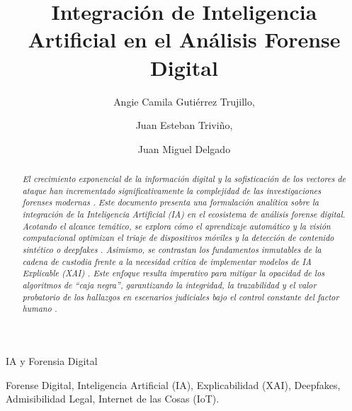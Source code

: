 \documentclass[journal]{IEEEtran}
\begin{document}
\title{Integración de Inteligencia Artificial en el Análisis Forense Digital}

\author{Angie Camila Gutiérrez Trujillo, %
\and Juan Esteban Triviño,  %
\and Juan Miguel Delgado %
}

%
{IA y Forensia Digital}

\maketitle
\thispagestyle{empty}
\pagestyle{empty}

\begin{abstract}
\normalfont\itshape
El crecimiento exponencial de la información digital y la sofisticación de los vectores de ataque han incrementado significativamente la complejidad de las investigaciones forenses modernas \cite{PadilhaRafael2021AIAe}. Este documento presenta una formulación analítica sobre la integración de la Inteligencia Artificial (IA) en el ecosistema de análisis forense digital. Acotando el alcance temático, se explora cómo el aprendizaje automático y la visión computacional optimizan el triaje de dispositivos móviles \cite{VASILARAS2024301737} y la detección de contenido sintético o \textit{deepfakes} \cite{BharatiNitu2026EddA, Al-ImranMd2025DACF}. Asimismo, se contrastan los fundamentos inmutables de la cadena de custodia frente a la necesidad crítica de implementar modelos de IA Explicable (XAI) \cite{HermosillaPamela2025EAfF, HallStuartW.2022APoC}. Este enfoque resulta imperativo para mitigar la opacidad de los algoritmos de ``caja negra'', garantizando la integridad, la trazabilidad y el valor probatorio de los hallazgos en escenarios judiciales bajo el control constante del factor humano \cite{FAHNDRICH2023301617, 10.1145/3560107.3560114}.
\end{abstract}

\begin{IEEEkeywords}
Forense Digital, Inteligencia Artificial (IA), Explicabilidad (XAI), Deepfakes, Admisibilidad Legal, Internet de las Cosas (IoT).
\end{IEEEkeywords}

\end{document}
